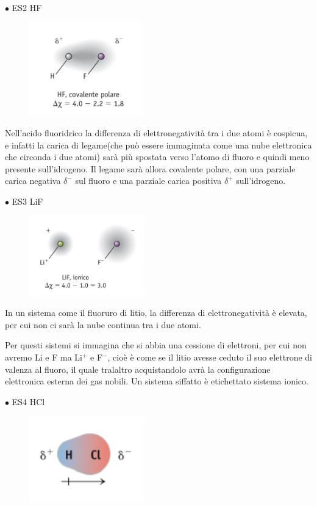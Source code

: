 $\bullet$ ES2 HF

\begin{figure}[htp]
    \centering
    \includegraphics[width=5cm]{immagini/HF.png}
\end{figure}
Nell'acido fluoridrico la differenza di elettronegatività tra i due atomi è cospicua, e infatti la carica di legame(che può essere immaginata come una nube elettronica che circonda i due atomi) sarà più spostata verso l'atomo di fluoro e quindi meno presente sull'idrogeno. Il legame sarà allora covalente polare, con una parziale carica negativa $\delta^-$ sul fluoro e una parziale carica positiva $\delta^+$ sull'idrogeno. 

$\bullet$ ES3 LiF

\begin{figure}[htp]
    \centering
    \includegraphics[width=5cm]{immagini/LiF.png}
\end{figure}

In un sistema come il fluoruro di litio, la differenza di elettronegatività è elevata, per cui non ci sarà la nube continua tra i due atomi.

Per questi sistemi si immagina che si abbia una cessione di elettroni, per cui non avremo Li e F ma Li$^+$ e F$^-$, cioè è come se il litio avesse ceduto il suo elettrone di valenza al fluoro, il quale tralaltro acquistandolo avrà la configurazione elettronica esterna dei gas nobili.
Un sistema siffatto è etichettato sistema ionico.

$\bullet$ ES4 HCl

\begin{figure}[htp]
    \centering
    \includegraphics[width=5cm]{immagini/HCl.png}
\end{figure}

